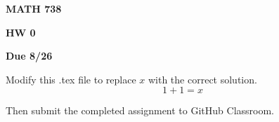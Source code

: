 \documentclass[12pt]{amsart}
\begin{document}
\centerline{\bf MATH 738}
\centerline{\bf HW 0} 
\centerline{\bf Due 8/26}

\vspace{2em}

Modify this .tex file to replace $x$ with the correct solution. 
\begin{displaymath}
    1+1 = x
\end{displaymath}

Then submit the completed assignment to GitHub Classroom. 
\end{document}
